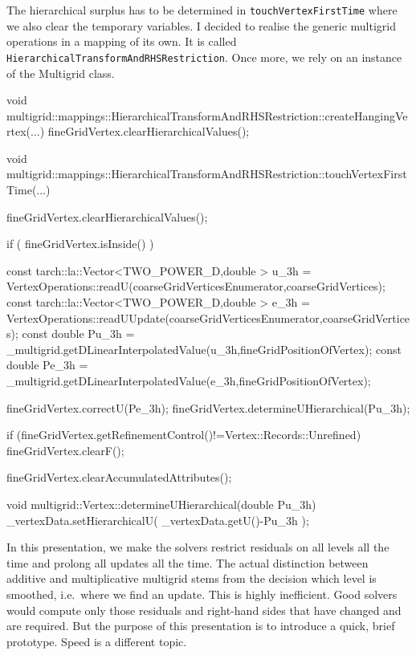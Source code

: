 \noindent
The hierarchical surplus has to be determined in \texttt{touchVertexFirstTime}
where we also clear the temporary variables.
I decided to realise the generic multigrid operations in a mapping of its own. 
It is called \texttt{HierarchicalTransformAndRHSRestriction}.
Once more, we rely on an instance of the Multigrid class.

\begin{code}
void
multigrid::mappings::HierarchicalTransformAndRHSRestriction::createHangingVertex(...) { 
 fineGridVertex.clearHierarchicalValues();
}

void multigrid::mappings::HierarchicalTransformAndRHSRestriction::touchVertexFirstTime(...) {
 fineGridVertex.clearHierarchicalValues();

 if ( fineGridVertex.isInside() ) {
   const tarch::la::Vector<TWO_POWER_D,double > u_3h  = 
     VertexOperations::readU(coarseGridVerticesEnumerator,coarseGridVertices);
   const tarch::la::Vector<TWO_POWER_D,double > e_3h  = 
     VertexOperations::readUUpdate(coarseGridVerticesEnumerator,coarseGridVertices);
   const double                                 Pu_3h = 
     _multigrid.getDLinearInterpolatedValue(u_3h,fineGridPositionOfVertex);
   const double                                 Pe_3h =
     _multigrid.getDLinearInterpolatedValue(e_3h,fineGridPositionOfVertex);

   fineGridVertex.correctU(Pe_3h);
   fineGridVertex.determineUHierarchical(Pu_3h);

   if (fineGridVertex.getRefinementControl()!=Vertex::Records::Unrefined) {
     fineGridVertex.clearF();
   }
 }

 fineGridVertex.clearAccumulatedAttributes();
}

void multigrid::Vertex::determineUHierarchical(double Pu_3h) {
  _vertexData.setHierarchicalU( _vertexData.getU()-Pu_3h );
}
\end{code}


\begin{remark}
  In this presentation, we make the solvers restrict residuals on all levels all
  the time and prolong all updates all the time.
  The actual distinction between additive and multiplicative multigrid stems from the decision which
  level is smoothed, i.e.~where we find an update. This is
  highly inefficient.
  Good solvers would compute only those residuals and right-hand sides that have changed and
  are required. But the purpose of this presentation is to introduce a quick,
  brief prototype. Speed is a different topic.
\end{remark}

